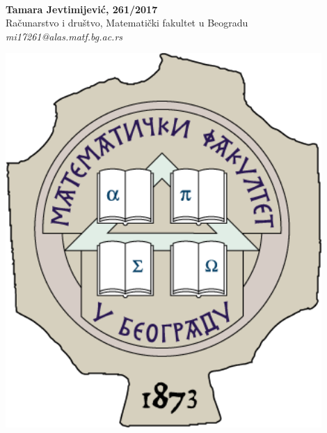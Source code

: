 \documentclass[a0,portrait]{a0poster}
\begin{document}
\begin{minipage}[b]{0.8\linewidth}
\color{NavyBlue}  
\color{Black}\\

\huge \textbf{Tamara Jevtimijević, 261/2017}\\[0.5cm]
\huge Računarstvo i društvo, Matematički fakultet u Beogradu\\[0.4cm] 
\Large \textit{mi17261@alas.matf.bg.ac.rs}\\
\end{minipage}
\begin{minipage}[b]{0.2\linewidth}
\includegraphics[width=12cm]{logo.png}\\
\end{minipage}
\vspace{3cm} 
\end{document}
